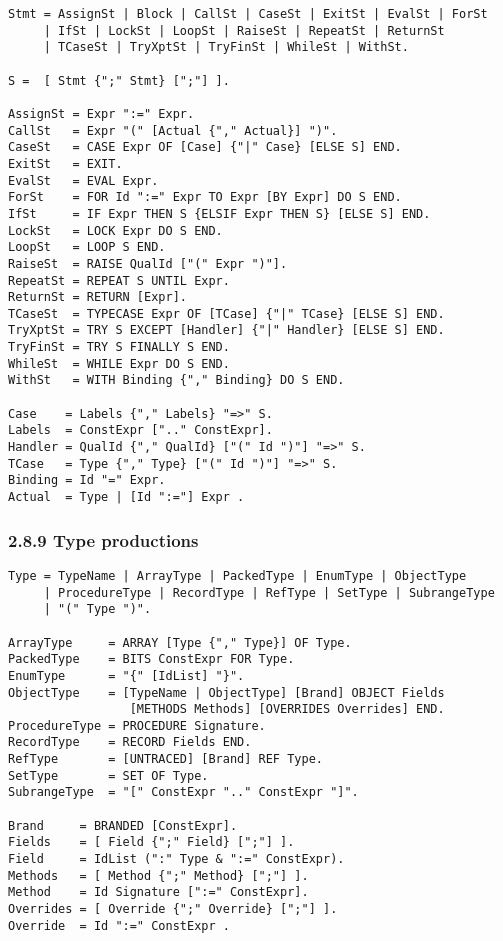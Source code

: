 \documentclass[10pt]{article}
\begin{document}
\begin{verbatim}
Stmt = AssignSt | Block | CallSt | CaseSt | ExitSt | EvalSt | ForSt
     | IfSt | LockSt | LoopSt | RaiseSt | RepeatSt | ReturnSt
     | TCaseSt | TryXptSt | TryFinSt | WhileSt | WithSt.

S =  [ Stmt {";" Stmt} [";"] ].

AssignSt = Expr ":=" Expr.
CallSt   = Expr "(" [Actual {"," Actual}] ")".
CaseSt   = CASE Expr OF [Case] {"|" Case} [ELSE S] END.
ExitSt   = EXIT.
EvalSt   = EVAL Expr.
ForSt    = FOR Id ":=" Expr TO Expr [BY Expr] DO S END.
IfSt     = IF Expr THEN S {ELSIF Expr THEN S} [ELSE S] END.
LockSt   = LOCK Expr DO S END.
LoopSt   = LOOP S END.
RaiseSt  = RAISE QualId ["(" Expr ")"].
RepeatSt = REPEAT S UNTIL Expr.
ReturnSt = RETURN [Expr].
TCaseSt  = TYPECASE Expr OF [TCase] {"|" TCase} [ELSE S] END.
TryXptSt = TRY S EXCEPT [Handler] {"|" Handler} [ELSE S] END.
TryFinSt = TRY S FINALLY S END.
WhileSt  = WHILE Expr DO S END.
WithSt   = WITH Binding {"," Binding} DO S END.

Case    = Labels {"," Labels} "=>" S.
Labels  = ConstExpr [".." ConstExpr].
Handler = QualId {"," QualId} ["(" Id ")"] "=>" S.
TCase   = Type {"," Type} ["(" Id ")"] "=>" S.
Binding = Id "=" Expr.
Actual  = Type | [Id ":="] Expr .
\end{verbatim}

\subsubsection*{2.8.9 Type productions}

\begin{verbatim}
Type = TypeName | ArrayType | PackedType | EnumType | ObjectType
     | ProcedureType | RecordType | RefType | SetType | SubrangeType
     | "(" Type ")".

ArrayType     = ARRAY [Type {"," Type}] OF Type.
PackedType    = BITS ConstExpr FOR Type.
EnumType      = "{" [IdList] "}".
ObjectType    = [TypeName | ObjectType] [Brand] OBJECT Fields
                 [METHODS Methods] [OVERRIDES Overrides] END.
ProcedureType = PROCEDURE Signature.
RecordType    = RECORD Fields END.
RefType       = [UNTRACED] [Brand] REF Type.
SetType       = SET OF Type.
SubrangeType  = "[" ConstExpr ".." ConstExpr "]".

Brand     = BRANDED [ConstExpr].
Fields    = [ Field {";" Field} [";"] ].
Field     = IdList (":" Type & ":=" ConstExpr).
Methods   = [ Method {";" Method} [";"] ].
Method    = Id Signature [":=" ConstExpr].
Overrides = [ Override {";" Override} [";"] ].
Override  = Id ":=" ConstExpr .
\end{verbatim}
\end{document}
